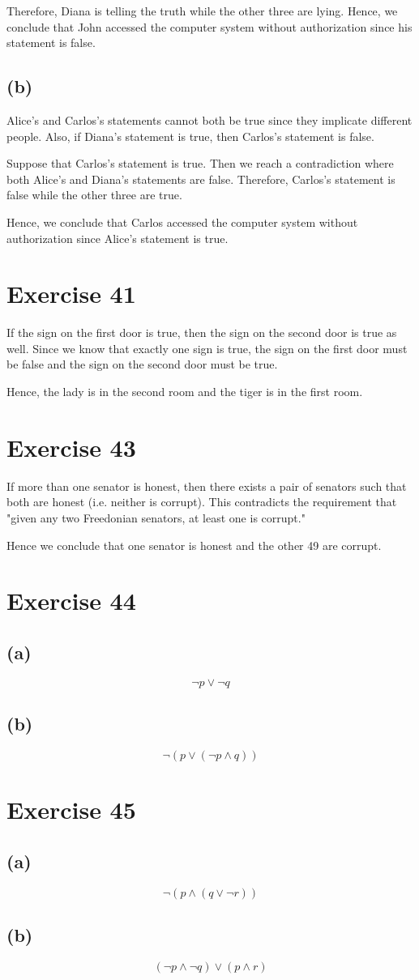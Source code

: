 \documentclass{article}
\begin{document}
Therefore, Diana is telling the truth while the other three are lying. Hence, we conclude that John accessed the computer system without authorization since his statement is false.

\subsection{(b)}
Alice's and Carlos's statements cannot both be true since they implicate different people. Also, if Diana's statement is true, then Carlos's statement is false.

Suppose that Carlos's statement is true. Then we reach a contradiction where both Alice's and Diana's statements are false. Therefore, Carlos's statement is false while the other three are true.

Hence, we conclude that Carlos accessed the computer system without authorization since Alice's statement is true.

\pagebreak

\section{Exercise 41}
If the sign on the first door is true, then the sign on the second door is true as well. Since we know that exactly one sign is true, the sign on the first door must be false and the sign on the second door must be true.

Hence, the lady is in the second room and the tiger is in the first room.

\pagebreak

\section{Exercise 43}
If more than one senator is honest, then there exists a pair of senators such that both are honest (i.e. neither is corrupt). This contradicts the requirement that "given any two Freedonian senators, at least one is corrupt."

Hence we conclude that one senator is honest and the other 49 are corrupt.

\pagebreak

\section{Exercise 44}
\subsection{(a)}
\[
	\neg p \lor \neg q
\]
\subsection{(b)}
\[
	\neg (p \lor (\neg p \land q))
\]

\pagebreak

\section{Exercise 45}
\subsection{(a)}
\[
	\neg (p \land (q \lor \neg r))
\]

\subsection{(b)}
\[
	(\neg p \land \neg q) \lor (p \land r)
\]
\end{document}
